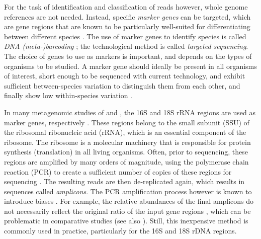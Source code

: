 For the task of identification and classification of reads however, whole genome references are not needed.
Instead, specific \emph{marker genes} can be targeted,
which are gene regions that are known to be
particularly well-suited for differentiating between different species \cite{Ren2016}.
The use of marker genes to identify species is called \emph{DNA (meta-)barcoding} \cite{Hebert2003,Savolainen2005,Deiner2017b};
the technological method is called \emph{targeted sequencing}.
The choice of genes to use as markers is important, and depends on the types of organisms to be studied.
A marker gene should ideally be present in all organisms of interest,
short enough to be sequenced with current technology,
and exhibit sufficient between-species variation to distinguish them from each other,
and finally show low within-species variation \cite{Kress2008}.


In many metagenomic studies of  and ,
the 16S \cite{Weisburg1991} and 18S \cite{Meyer2010} rRNA regions are used as marker genes,
respectively \cite{Woese1977,Woese1990}.
These regions belong to the small subunit (SSU) of the ribosomal ribonucleic acid (rRNA),
which is an essential component of the ribosome.
The ribosome is a molecular machinery that is responsible for protein synthesis (translation) in all living organisms.
Often, prior to sequencing, these regions are amplified by many orders of magnitude,
using the polymerase chain reaction (PCR)
to create a sufficient number of copies of these regions for sequencing \cite{Bartlett2003}.
The resulting reads are then de-replicated again, which results in sequences called \emph{amplicons}.
The PCR amplification process however is known to introduce biases \cite{Logares2014,Brown2017}.
For example, the relative abundances of the final amplicons
do not necessarily reflect the original ratio of the input gene regions \cite{Kanagawa2003},
which can be problematic in comparative studies
(see also ).
Still, this inexpensive method is commonly used in practice, particularly for the 16S and 18S rDNA regions.

